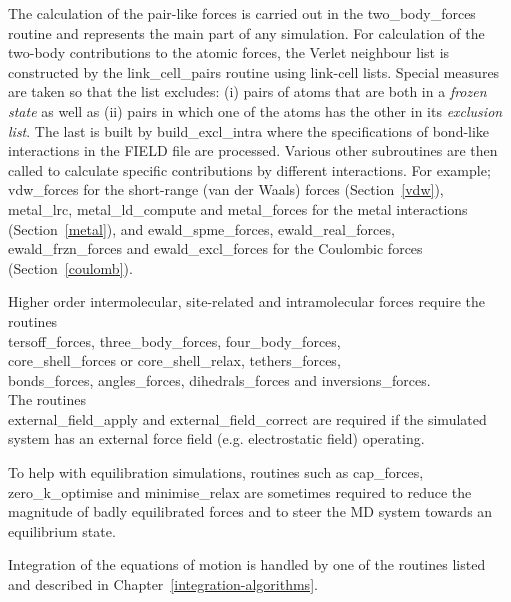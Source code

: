 The calculation of the pair-like forces is carried out in the
{\sc two\_body\_forces} routine and represents the main part of any
simulation.  For calculation of the two-body contributions to the
atomic forces, the Verlet neighbour list
is constructed by the {\sc link\_cell\_pairs} routine using link-cell
lists.  Special measures are taken so that the list excludes: (i)
pairs of atoms that are both in a {\em frozen state} as well as (ii)
pairs in which one of the atoms has the other in its
{\em exclusion list}.  The last is built by {\sc build\_excl\_intra}
where the specifications of bond-like interactions in the FIELD file
are processed.  Various other subroutines are then called to
calculate specific contributions by different interactions.  For example;
{\sc vdw\_forces} for the short-range (van der Waals)
forces (Section~\ref{vdw}), {\sc metal\_lrc}, {\sc metal\_ld\_compute} and
{\sc metal\_forces} for the metal interactions 
(Section~\ref{metal}), and {\sc ewald\_spme\_forces}, {\sc ewald\_real\_forces},
{\sc ewald\_frzn\_forces} and {\sc ewald\_excl\_forces} for the
Coulombic forces (Section~\ref{coulomb}).

Higher order intermolecular, site-related 
and intramolecular forces
require the routines \\
{\sc tersoff\_forces}, {\sc three\_body\_forces},
{\sc four\_body\_forces}, \\
{\sc core\_shell\_forces} or {\sc core\_shell\_relax},
{\sc tethers\_forces}, \\
{\sc bonds\_forces}, {\sc angles\_forces}, {\sc dihedrals\_forces}
and {\sc inversions\_forces}.  \\
The routines \\
{\sc external\_field\_apply} and {\sc external\_field\_correct}
are required if the simulated system has an external force field
(e.g. electrostatic field) operating.

To help with equilibration simulations, routines such as
{\sc cap\_forces}, {\sc zero\_k\_optimise} and {\sc minimise\_relax}
are sometimes required to reduce the magnitude of badly
equilibrated forces and to steer the MD system towards an
equilibrium state.

Integration of the equations of motion is handled by one of the
routines listed and described in Chapter~\ref{integration-algorithms}.

